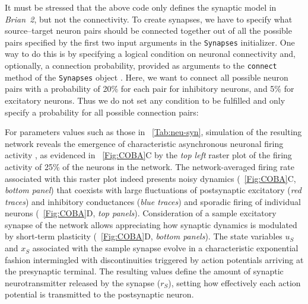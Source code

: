 \documentclass[a4paper, 11pt]{article}
\newcommand{\brian}{\emph{Brian~2}\xspace}
\newcommand*{\tabref}[1]{\tablename~\ref{#1}}
\newcommand*{\figref}[1]{\figurename~\ref{#1}}
\begin{document}
It must be stressed that the above code only defines the synaptic model in \brian, but not the connectivity. To create synapses, we have to specify what source--target neuron pairs should be connected together out of all the possible pairs specified by the first two input arguments in the \lstinline|Synapses| initializer.
One way to do this is by specifying a logical condition on neuronal connectivity and, optionally, a connection probability, provided as arguments to the \lstinline|connect| method of the \lstinline|Synapses| object \citep{Stimberg2014}.
Here, we want to connect all possible neuron pairs with a probability of 20\% for each pair for inhibitory neurons, and 5\% for excitatory neurons.
Thus we do not set any condition to be fulfilled and only specify a probability for all possible connection pairs:

For parameters values such as those in \tabref{Tab:neu-syn}, simulation of the resulting network reveals the emergence of characteristic asynchronous neuronal firing activity \citep{Brunel2000}, as evidenced in \figref{Fig:COBA}C by the \textit{top left} raster plot of the firing activity of 25\% of the neurons in the network.
The network-averaged firing rate associated with this raster plot indeed presents noisy dynamics (\figref{Fig:COBA}C, \textit{bottom panel}) that coexists with large fluctuations of postsynaptic excitatory (\textit{red traces}) and inhibitory conductances (\textit{blue traces}) and sporadic firing of individual neurons (\figref{Fig:COBA}D, \textit{top panels}).
Consideration of a sample excitatory synapse of the network allows appreciating how synaptic dynamics is modulated by short-term plasticity (\figref{Fig:COBA}D, \textit{bottom panels}).
The state variables $u_S$ and $x_S$ associated with the sample synapse evolve in a characteristic exponential fashion intermingled with discontinuities triggered by action potentials arriving at the presynaptic terminal.
The resulting values define the amount of synaptic neurotransmitter released by the synapse ($r_S$), setting how effectively each action potential is transmitted to the postsynaptic neuron.
\end{document}
